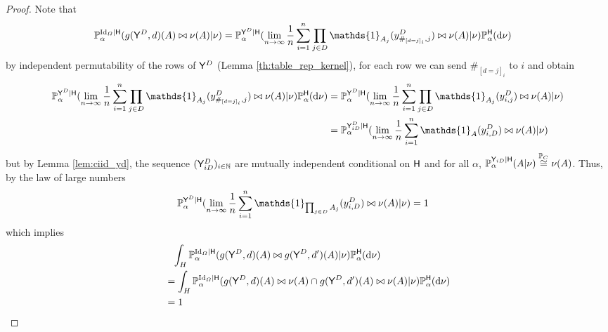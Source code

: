 \begin{proof}
Note that
\begin{align}
     \prob{P}_\alpha^{\mathrm{Id}_{\Omega}|\RV{H}}(g(\RV{Y}^D,d)(A)\yields \nu(A)|\nu) &= \prob{P}_\alpha^{\RV{Y}^D|\RV{H}}(\lim_{n\to\infty}\frac{1}{n}\sum_{i=1}^n \prod_{j\in D} \mathds{1}_{A_j}(y^D_{\#_{[d=j]_i},j})\yields \nu(A)| \nu)\prob{P}_\alpha^{\RV{H}}(\mathrm{d}\nu)
\end{align}
by independent permutability of the rows of $\mathsf{Y}^D$ (Lemma \ref{th:table_rep_kernel}), for each row we can send $\#_{[d=j]_i}$ to $i$ and obtain
\begin{align}
    \prob{P}_\alpha^{\RV{Y}^D|\RV{H}}(\lim_{n\to\infty}\frac{1}{n}\sum_{i=1}^n \prod_{j\in D} \mathds{1}_{A_j}(y^D_{\#_{[d=j]_i},j})\yields \nu(A)| \nu)\prob{P}_\alpha^{\RV{H}}(\mathrm{d}\nu) &= \prob{P}_\alpha^{\RV{Y}^D|\RV{H}} (\lim_{n\to\infty}\frac{1}{n}\sum_{i=1}^n \prod_{j\in D} \mathds{1}_{A_j}(y^D_{i,j})\yields \nu(A)| \nu)\\
    &= \prob{P}_\alpha^{\RV{Y}^D_{iD}|\RV{H}} (\lim_{n\to\infty}\frac{1}{n}\sum_{i=1}^n \mathds{1}_{A}(y^D_{i,D})\yields \nu(A)| \nu)
\end{align}
but by Lemma \ref{lem:ciid_yd}, the sequence $(\mathsf{Y}^D_{iD})_{i\in \mathbb{N}}$ are mutually independent conditional on $\mathsf{H}$ and for all $\alpha$, $\mathbb{P}_\alpha^{\mathsf{Y}_{iD}|\mathsf{H}}(A|\nu)\overset{\mathbb{P}_C}{\cong}\nu(A)$. Thus, by the law of large numbers
\begin{align}
    \prob{P}_\alpha^{\RV{Y}^D|\RV{H}} (\lim_{n\to\infty}\frac{1}{n}\sum_{i=1}^n \mathds{1}_{\prod_{j\in D} A_j}(y^D_{i,D})\yields \nu(A)| \nu)&= 1
\end{align}
which implies
\begin{align}
     &\phantom{=}\int_H \mathbb{P}_\alpha^{\mathrm{Id}_{\Omega}|\mathsf{H}}(g(\mathsf{Y}^D,d)(A)\bowtie g(\mathsf{Y}^D,d')(A)|\nu)\mathbb{P}_\alpha^{\mathsf{H}}(\mathrm{d}\nu) \\
     &= \int_H \mathbb{P}_\alpha^{\mathrm{Id}_{\Omega}|\mathsf{H}}(g(\mathsf{Y}^D,d)(A)\bowtie \nu(A) \cap  g(\mathsf{Y}^D,d')(A)\bowtie \nu(A)|\nu)\mathbb{P}_\alpha^{\mathsf{H}}(\mathrm{d}\nu)\\
    &= 1
\end{align}


\end{proof}
